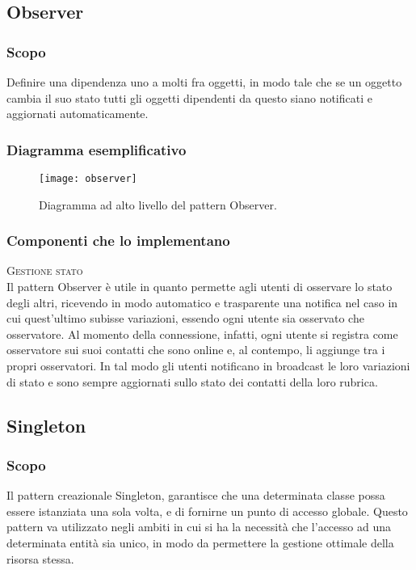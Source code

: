 \subsection{Observer}
\subsubsection{Scopo}
Definire una dipendenza uno a molti fra oggetti, in modo tale che se un oggetto cambia il suo stato tutti gli oggetti dipendenti da questo siano notificati e aggiornati automaticamente.

\subsubsection{Diagramma esemplificativo}
\begin{figure}[h]
\centering
\texttt{[image: observer]}
\caption{Diagramma ad alto livello del pattern Observer.}\label{fig:observer}
\end{figure}

\subsubsection{Componenti che lo implementano}
\begin{description}
  \item{\scshape\ttfamily Gestione stato}\\
Il pattern Observer è utile in quanto permette agli utenti di osservare lo stato degli altri, ricevendo in modo automatico e trasparente una notifica nel caso in cui quest'ultimo subisse variazioni, essendo ogni utente sia osservato che osservatore. Al momento della connessione, infatti, ogni utente si registra come osservatore sui suoi contatti che sono online e, al contempo, li aggiunge tra i propri osservatori. In tal modo gli utenti notificano in broadcast le loro variazioni di stato e sono sempre aggiornati sullo stato dei contatti della loro rubrica.
\end{description}

\subsection{Singleton}
\subsubsection{Scopo}
Il pattern creazionale Singleton, garantisce che una determinata classe possa essere istanziata una sola volta, e di fornirne un punto di accesso globale. Questo pattern va utilizzato negli ambiti in cui si ha la necessità che l'accesso ad una determinata entità sia unico, in modo da permettere la gestione ottimale della risorsa stessa.
